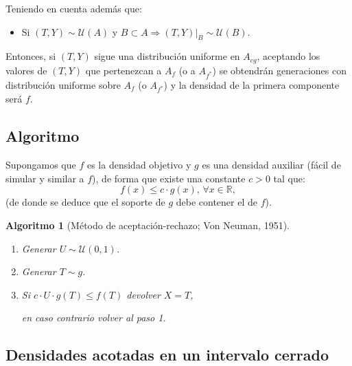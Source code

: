\documentclass[
]{book}
\providecommand{\tightlist}{%
  \setlength{\itemsep}{0pt}\setlength{\parskip}{0pt}}
\theoremstyle{break}
\newtheorem{conjecture}{Algoritmo}[chapter]
\theoremstyle{nonumberplain}
\begin{document}
Teniendo en cuenta además que:

\begin{itemize}
\tightlist
\item
  Si \(\left( T,Y\right) \sim \mathcal{U}\left( A\right)\) y
  \(B \subset A\Rightarrow \left. \left( T,Y\right) \right\vert _{B} \sim \mathcal{U}\left(B\right)\).
\end{itemize}

Entonces, si \(\left( T, Y \right)\) sigue una distribución uniforme en \(A_{cg}\), aceptando los valores de \(\left( T, Y\right)\) que pertenezcan a \(A_{f}\) (o a \(A_{f^{\ast}}\)) se obtendrán generaciones con distribución uniforme sobre \(A_{f}\) (o \(A_{f^{\ast}}\)) y la densidad de la primera componente será \(f\).

\hypertarget{algoritmo}{%
\subsection{Algoritmo}\label{algoritmo}}

Supongamos que \(f\) es la densidad objetivo y \(g\) es una densidad
auxiliar (fácil de simular y similar a \(f\)), de forma que
existe una constante \(c>0\) tal que:
\[f(x) \leq c\cdot g(x) 
\text{, }\forall x\in \mathbb{R},\]
(de donde se deduce que el soporte de \(g\) debe contener el de \(f\)).

\begin{conjecture}[Método de aceptación-rechazo; Von Neuman, 1951]
\protect\hypertarget{cnj:aceptacion-rechazo}{}\label{cnj:aceptacion-rechazo}

\begin{enumerate}
\def\labelenumi{\arabic{enumi}.}
\item
  Generar \(U \sim \mathcal{U}(0, 1)\).
\item
  Generar \(T\sim g\).
\item
  Si \(c\cdot U\cdot g\left( T\right) \leq f\left( T\right)\)
  devolver \(X=T\),

  en caso contrario volver al paso 1.
\end{enumerate}

\end{conjecture}

\hypertarget{densidades-acotadas-en-un-intervalo-cerrado}{%
\subsection{Densidades acotadas en un intervalo cerrado}\label{densidades-acotadas-en-un-intervalo-cerrado}}
\end{document}
